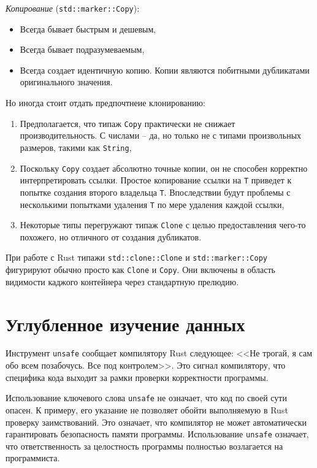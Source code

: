 \documentclass[%
	11pt,
	a4paper,
	utf8,
		]{article}
\begin{document}
\emph{Копирование} (\verb|std::marker::Copy|):
\begin{itemize}
	\item Всегда бывает быстрым и дешевым,
	
	\item Всегда бывает подразумеваемым,
	
	\item Всегда создает идентичную копию. Копии являются побитными дубликатами оригинального значения.
\end{itemize}

Но иногда стоит отдать предпочтнеие клонированию:
\begin{enumerate}
	\item Предполагается, что типаж \texttt{Copy} практически не снижает производительность. С числами -- да, но только не с типами произвольных размеров, такими как \texttt{String},
	
	\item Поскольку \texttt{Copy} создает абсолютно точные копии, он не способен корректно интерпретировать ссылки. Простое копирование ссылки на \texttt{T} приведет к попытке создания второго владельца \texttt{T}. Впоследствии будут проблемы с несколькими попытками удаления \texttt{T} по мере удаления каждой ссылки,
	
	\item Некоторые типы перегружают типаж \texttt{Clone} с целью предоставления чего-то похожего, но отличного от создания дубликатов.
\end{enumerate}

При работе с Rust типажи \verb|std::clone::Clone| и \verb|std::marker::Copy| фигурируют обычно просто как \verb|Clone| и \verb|Copy|. Они включены в область видимости каджого контейнера через стандартную прелюдию.

\section{Углубленное изучение данных}

Инструмент \texttt{unsafe} сообщает компилятору Rust следующее: <<Не трогай, я сам обо всем позабочусь. Все под контролем>>. Это сигнал компилятору, что специфика кода выходит за рамки проверки корректности программы.

Использование ключевого слова \texttt{unsafe} не означает, что код по своей сути опасен. К примеру, его указание не позволяет обойти выполняемую в Rust проверку заимствований. Это означает, что компилятор не может автоматически гарантировать безопасность памяти программы. Использование \texttt{unsafe} означает, что ответственность за целостность программы полностью возлагается на программиста.
\end{document}
